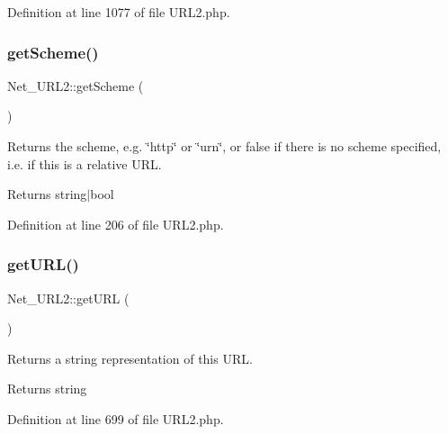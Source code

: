 Definition at line 1077 of file U\+R\+L2.\+php.

\hypertarget{classNet__URL2_a9ebbd0b1bc71024ce48593cb1faeff41}{}\label{classNet__URL2_a9ebbd0b1bc71024ce48593cb1faeff41} 
\subsubsection{\texorpdfstring{get\+Scheme()}{getScheme()}}
{\footnotesize\ttfamily Net\+\_\+\+U\+R\+L2\+::get\+Scheme (\begin{DoxyParamCaption}{ }\end{DoxyParamCaption})}

Returns the scheme, e.\+g. \char`\"{}http\char`\"{} or \char`\"{}urn\char`\"{}, or false if there is no scheme specified, i.\+e. if this is a relative U\+RL.

\begin{DoxyReturn}{Returns}
string$\vert$bool 
\end{DoxyReturn}


Definition at line 206 of file U\+R\+L2.\+php.

\hypertarget{classNet__URL2_a77d3197589861087e09db160a78c7ee1}{}\label{classNet__URL2_a77d3197589861087e09db160a78c7ee1} 
\subsubsection{\texorpdfstring{get\+U\+R\+L()}{getURL()}}
{\footnotesize\ttfamily Net\+\_\+\+U\+R\+L2\+::get\+U\+RL (\begin{DoxyParamCaption}{ }\end{DoxyParamCaption})}

Returns a string representation of this U\+RL.

\begin{DoxyReturn}{Returns}
string 
\end{DoxyReturn}


Definition at line 699 of file U\+R\+L2.\+php.

\hypertarget{classNet__URL2_ad06292db039e4723ce457f416fc61763}{}\label{classNet__URL2_ad06292db039e4723ce457f416fc61763} 
